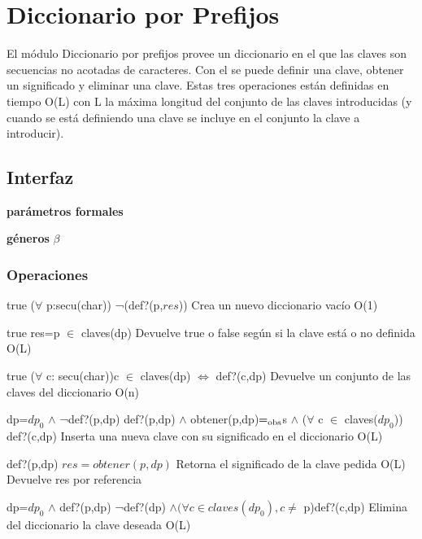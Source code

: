 \section{Diccionario por Prefijos}

El m\'odulo Diccionario por prefijos provee un diccionario en el que las claves son secuencias no acotadas de caracteres. Con el se puede definir una clave, obtener un significado y eliminar una clave.
Estas tres operaciones est\'an definidas en tiempo O(L) con L la m\'axima longitud del conjunto de las claves introducidas (y cuando se est\'a definiendo una clave se incluye en el conjunto la clave a introducir).

\subsection{Interfaz}

  \textbf{par\'ametros formales}
  
  \textbf{g\'eneros} $\beta$\\
 





\subsubsection*{Operaciones}

{true}
{($\forall$ p:secu(char)) ¬(def?(p,$res$))}
{Crea un nuevo diccionario vac\'io}
{O(1)}
{}


{true}
{res=p $\in$ claves(dp)}
{Devuelve true o false seg\'un si la clave est\'a o no definida}
{O(L)}
{}

{true}
{($\forall$ c: secu(char))c $\in$ claves(dp) $\iff$ def?(c,dp)}
{Devuelve un conjunto de las claves del diccionario}
{O(n)}
{}

{dp=$dp_0$ $\land$ ¬def?(p,dp)}
{def?(p,dp) $\land$ obtener(p,dp)$=_{\mathrm{obs}}$s $\land$ ($\forall$ c $\in$ claves($dp_0$)) def?(c,dp)}
{Inserta una nueva clave con su significado en el diccionario}
{O(L)}
{}


{def?(p,dp)}
{$res = obtener(p,dp)$}
{Retorna el significado de la clave pedida}
{O(L)}
{Devuelve res por referencia}


{dp=$dp_0$ $\land$ def?(p,dp)}
{¬def?(dp) $\land (\forall c \in claves(dp_0),c\neq$ p)def?(c,dp)}
{Elimina del diccionario la clave deseada}
{O(L)}
{}

